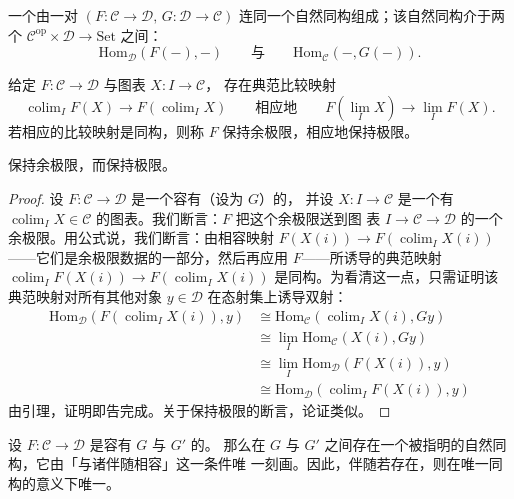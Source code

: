 \begin{definition}\label{def:adjunction}
一个\emph{\trAdjunction{}}由一对\trFunctor{} $(F\colon \mathcal{C} \to \mathcal{D},\, G\colon \mathcal{D} \to \mathcal{C})$ 连同一个自然同构组成；该自然同构介于两个\trFunctor{}%
$\mathcal{C}^{\mathrm{op}} \times \mathcal{D} \to \mathrm{Set}$ 之间：
\[
\mathrm{Hom}_{\mathcal{D}}(F(-),-)
\qquad\text{与}\qquad
\mathrm{Hom}_{\mathcal{C}}(-,G(-)).
\]
\end{definition}

给定\trFunctor{} $F\colon \mathcal{C} \to \mathcal{D}$ 与图表 $X\colon I \to \mathcal{C}$，
存在典范比较映射
\[
\operatorname{colim}_I F(X) \longrightarrow F(\operatorname{colim}_I X)
\qquad\text{相应地}\qquad
F(\operatorname{lim}_I X) \longrightarrow \operatorname{lim}_I F(X).
\]
若相应的比较映射是同构，则称 $F$ 保持余极限，相应地保持极限。

\begin{lemma}\label{lem:adjoints-preserve}
\trLeftAdjoint{}保持余极限，而\trRightAdjoint{}保持极限。
\end{lemma}
\begin{proof}
设 $F\colon \mathcal{C} \to \mathcal{D}$ 是一个容有\trRightAdjoint{}（设为 $G$）的\trFunctor{}，
并设 $X\colon I \to \mathcal{C}$ 是一个有\trColimit{}%
$\operatorname{colim}_I X \in \mathcal{C}$ 的图表。我们断言：$F$ 把这个余极限送到图
表 $I \to \mathcal{C} \to \mathcal{D}$ 的一个余极限。用公式说，我们断言：由相容映射
$F(X(i)) \to F(\operatorname{colim}_I X(i))$——它们是余极限数据的一部分，然后再应用
$F$——所诱导的典范映射 $\operatorname{colim}_I F(X(i)) \to F(\operatorname{colim}_I X(i))$
是同构。为看清这一点，只需证明该典范映射对所有其他对象 $y \in \mathcal{D}$
在态射集上诱导双射：
\begin{align*}
\mathrm{Hom}_{\mathcal{D}}(F(\operatorname{colim}_I X(i)), y)
&\cong \mathrm{Hom}_{\mathcal{C}}(\operatorname{colim}_I X(i), Gy) \\
&\cong \operatorname{lim}_I \mathrm{Hom}_{\mathcal{C}}(X(i), Gy) \\
&\cong \operatorname{lim}_I \mathrm{Hom}_{\mathcal{D}}(F(X(i)), y) \\
&\cong \mathrm{Hom}_{\mathcal{D}}(\operatorname{colim}_I F(X(i)), y)
\end{align*}
由\trYoneda{}引理，证明即告完成。关于\trRightAdjoint{}保持极限的断言，论证类似。
\end{proof}

\begin{lemma}\label{lem:adjoint-unique}
设 $F\colon \mathcal{C} \to \mathcal{D}$ 是容有\trRightAdjoint{} $G$ 与 $G'$ 的\trFunctor{}。
那么在 $G$ 与 $G'$ 之间存在一个被指明的自然同构，它由「与诸伴随相容」这一条件唯
一刻画。因此，伴随\trFunctor{}若存在，则在唯一同构的意义下唯一。
\end{lemma}

